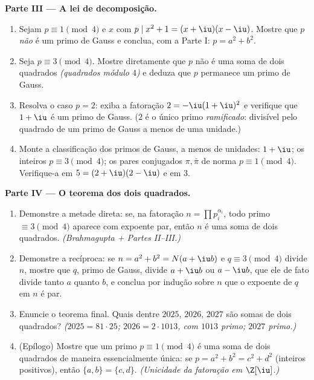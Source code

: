\begin{problem}
\medskip
\noindent\textbf{Parte III --- A lei de decomposição.}
\begin{enumerate}[resume]
  \item Sejam $p \equiv 1 \pmod 4$ e $x$ com $p \mid x^2 + 1 =
        (x + \iu)(x - \iu)$. Mostre que $p$ \emph{não}
        é um primo de Gauss e conclua, com a Parte I: $p = a^2 + b^2$.
  \item Seja $p \equiv 3 \pmod 4$. Mostre diretamente que $p$ não é uma soma de
        dois quadrados \emph{(quadrados módulo $4$)} e deduza que
        $p$ permanece um primo de Gauss.
  \item Resolva o caso $p = 2$: exiba a fatoração $2 =
        -\iu(1+\iu)^2$ e verifique
        que $1 + \iu$ é um primo de Gauss. ($2$ é o único primo
        \emph{ramificado}: divisível pelo quadrado de um primo de Gauss
        a menos de uma unidade.)
  \item Monte a classificação dos primos de Gauss, a menos de unidades:
        $1 + \iu$; os inteiros $p \equiv 3 \pmod 4$; os pares conjugados $\pi, \bar\pi$ de norma
        $p \equiv 1 \pmod
        4$. Verifique-a em $5 = (2+\iu)(2-\iu)$ e em $3$.
\end{enumerate}

\medskip
\noindent\textbf{Parte IV --- O teorema dos dois quadrados.}
\begin{enumerate}[resume]
  \item Demonstre a metade direta: se, na fatoração $n =
        \prod p_i^{\alpha_i}$, todo primo
        $\equiv 3 \pmod 4$ aparece com expoente par, então $n$ é uma soma de dois
        quadrados. \emph{(Brahmagupta + Partes II--III.)}
  \item Demonstre a recíproca: se $n = a^2 + b^2 = N(a + \iu b)$ e $q \equiv 3 \pmod 4$ divide $n$, mostre
        que $q$, primo de Gauss, divide $a + \iu b$ ou $a - \iu b$, que ele de
        fato divide tanto $a$ quanto $b$, e conclua por indução
        sobre $n$ que o expoente de $q$ em $n$ é par.
  \item Enuncie o teorema final. Quais dentre $2025$, $2026$,
        $2027$ são somas de dois quadrados? \emph{($2025 = 81 \cdot 25$; $2026 = 2 \cdot 1013$,
        com $1013$ primo; $2027$ primo.)}
  \item (Epílogo) Mostre que um primo $p \equiv 1 \pmod 4$ é uma soma de dois
        quadrados de maneira essencialmente única: se $p =
        a^2 + b^2 = c^2 + d^2$ (inteiros
        positivos), então $\{a, b\}
        = \{c, d\}$. \emph{(Unicidade da fatoração em
        $\Z[\iu]$.)}
\end{enumerate}


\end{problem}
